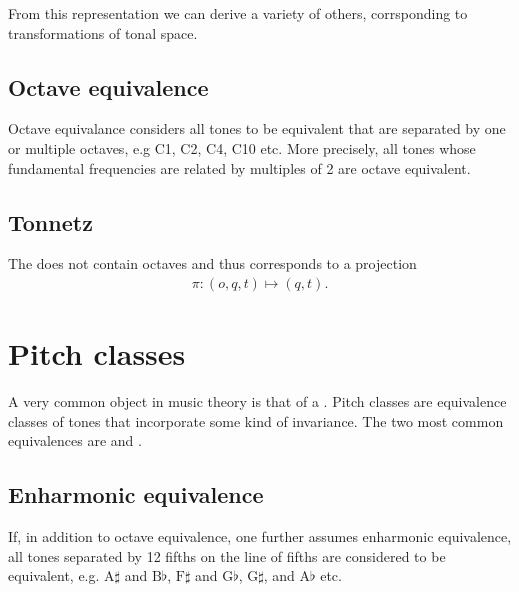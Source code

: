 \documentclass[letterpaper,10pt,english]{sphinxmanual}
\begin{document}
\begin{sphinxVerbatim}[commandchars=\\\{\}]
   

    
\end{sphinxVerbatim}

From this representation we can derive a variety of others, corrsponding to transformations of
tonal space.


\subsection{Octave equivalence}
\label{\detokenize{1_fundamentals:octave-equivalence}}
Octave equivalance considers all tones to be equivalent that are separated by one or
multiple octaves, e.g C1, C2, C4, C10 etc. More precisely, all tones whose fundamental frequencies
are related by multiples of 2 are octave equivalent.


\subsection{Tonnetz}
\label{\detokenize{1_fundamentals:tonnetz}}
The  does not contain octaves and thus corresponds to a projection
\begin{equation*}
\begin{split}\pi: (o, q, t) \mapsto (q, t).\end{split}
\end{equation*}

\section{Pitch classes}
\label{\detokenize{1_fundamentals:pitch-classes}}
A very common object in music theory is that of a . Pitch classes
are equivalence classes of tones that incorporate some kind of invariance.
The two most common equivalences are  and .


\subsection{Enharmonic equivalence}
\label{\detokenize{1_fundamentals:enharmonic-equivalence}}
If, in addition to octave equivalence, one further assumes enharmonic equivalence,
all tones separated by 12 fifths on the line of fifths
are considered to be equivalent, e.g. \(\text{A}\sharp\) and \(\text{B}\flat\),
\(\text{F}\sharp\) and \(\text{G}\flat\), \(\text{G}\sharp\), and \(\text{A}\flat\) etc.
\end{document}

